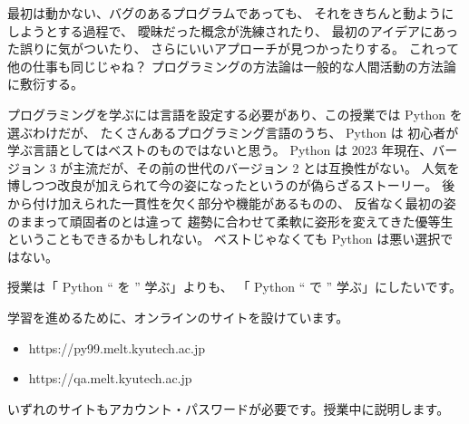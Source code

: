 最初は動かない、バグのあるプログラムであっても、
それをきちんと動ようにしようとする過程で、
曖昧だった概念が洗練されたり、
最初のアイデアにあった誤りに気がついたり、
さらにいいアプローチが見つかったりする。
これって他の仕事も同じじゃね？
プログラミングの方法論は一般的な人間活動の方法論に敷衍する。 %


プログラミングを学ぶには言語を設定する必要があり、この授業では Python を選ぶわけだが、
たくさんあるプログラミング言語のうち、 Python は
初心者が学ぶ言語としてはベストのものではないと思う。
Python は 2023 年現在、バージョン 3 が主流だが、その前の世代のバージョン 2 とは互換性がない。
人気を博しつつ改良が加えられて今の姿になったというのが偽らざるストーリー。
後から付け加えられた一貫性を欠く部分や機能があるものの、
反省なく最初の姿のままって頑固者のとは違って
趨勢に合わせて柔軟に姿形を変えてきた優等生ということもできるかもしれない。
ベストじゃなくても Python は悪い選択ではない。

授業は「 Python `` を '' 学ぶ」よりも、
「 Python `` で '' 学ぶ」にしたいです。


学習を進めるために、オンラインのサイトを設けています。

\begin{itemize}
\item https://py99.melt.kyutech.ac.jp
\item https://qa.melt.kyutech.ac.jp
\end{itemize}

いずれのサイトもアカウント・パスワードが必要です。授業中に説明します。

